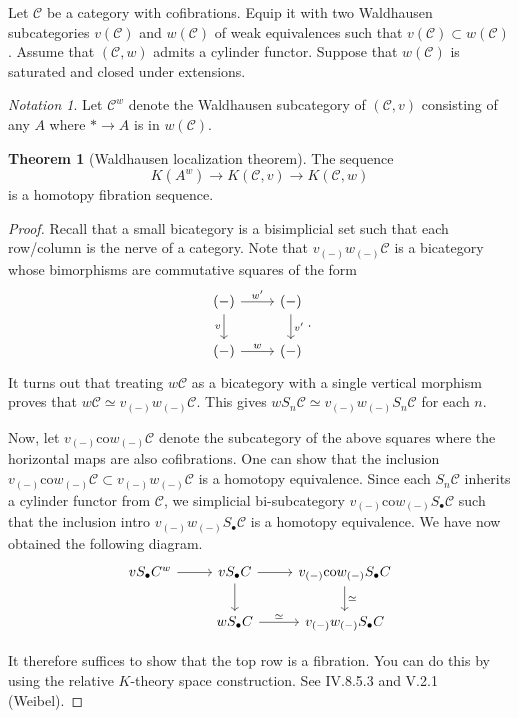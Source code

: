 \documentclass[10pt,letterpaper,cm]{nupset}
\theoremstyle{definition}
\theoremstyle{theorem}
\newtheorem{theorem}{Theorem}
\theoremstyle{remark}
\newtheorem*{notation}{Notation}
\newcommand{\1}{\mathbf{1}}
\renewcommand{\c}{\mathscr{C}}
\newcommand{\0}{\vec 0}
\begin{document}
Let $\c$ be a category with cofibrations. Equip it with two Waldhausen subcategories $v(\c)$ and $w(\c)$ of weak equivalences such that $v(\c) \subset w(\c)$. Assume that $(\c, w)$ admits a cylinder functor. Suppose that $w(\c)$ is saturated and closed under extensions. 
\begin{notation}
Let $\c^w$ denote the Waldhausen subcategory of $(\c, v)$ consisting of any $A$ where $\ast \to A$ is in $w(\c)$.
\end{notation}

\begin{theorem}[Waldhausen localization theorem]
The sequence $$ K(A^w) \to K(\c, v) \to K(\c, w) $$ is a homotopy fibration sequence.
\end{theorem}
\begin{proof}
Recall that a small bicategory is a bisimplicial set such that each row/column is the nerve of a category. Note that $v_{(-)}w_{(-)}\c$ is a bicategory whose bimorphisms are commutative squares of the form
\[
\begin{tikzcd}
(-) \arrow[r, "w'"] \arrow[d, "v"'] & (-) \arrow[d, "v'"] \\
(-) \arrow[r, "w"] & (-)
\end{tikzcd}.
\]
It turns out that treating $w \c$ as a bicategory with a single vertical morphism proves that $w \c \simeq v_{(-)}w_{(-)}\c$. This gives $wS_n \c \simeq v_{(-)}w_{(-)}S_n\c$ for each $n$.

\medskip

 Now, let $v_{(-)}\text{co}w_{(-)}\c$ denote the subcategory of the above squares where the horizontal maps are also cofibrations. One can show that the inclusion $v_{(-)}\text{co}w_{(-)}\c \subset v_{(-)}w_{(-)}\c$ is a homotopy equivalence. Since each $S_n \c$ inherits a cylinder functor from $\c$, we simplicial bi-subcategory $v_{(-)}\text{co}w_{(-)}S_{\bullet}\c$ such that the inclusion intro $v_{(-)}w_{(-)}S_{\bullet}\c$ is a homotopy equivalence. We have now obtained the following diagram.
\[
\begin{tikzcd}
vS_{\bullet}C^w \arrow[r] & vS_{\bullet}C \arrow[r] \arrow[d] & v_{(-)}\text{co}w_{(-)}S_{\bullet}C \arrow[d, "\simeq"] \\
 & wS_{\bullet}C \arrow[r, "\simeq"] & v_{(-)}w_{(-)}S_{\bullet}C
\end{tikzcd}
\]

\medskip

 It therefore suffices to show that the top row is a fibration. You can do this by using the relative $K$-theory space construction. See IV.8.5.3 and V.2.1 (Weibel).
\end{proof}
\end{document}
